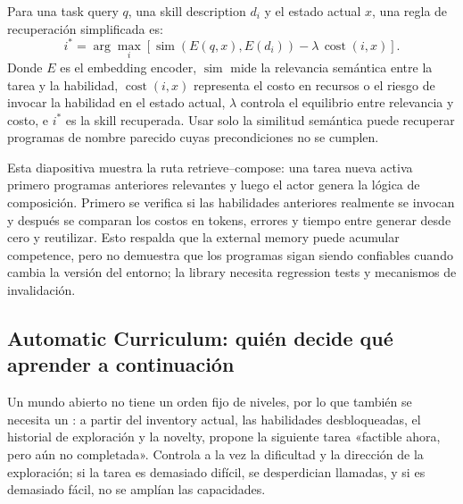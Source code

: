 Para una task query $q$, una skill description $d_i$ y el estado actual $x$, una regla de recuperación simplificada es:
\[
i^*=\arg\max_i\left[\operatorname{sim}(E(q,x),E(d_i))
-\lambda\,\operatorname{cost}(i,x)\right].
\]
Donde $E$ es el embedding encoder, $\operatorname{sim}$ mide la relevancia semántica entre la tarea y la habilidad, $\operatorname{cost}(i,x)$ representa el costo en recursos o el riesgo de invocar la habilidad en el estado actual, $\lambda$ controla el equilibrio entre relevancia y costo, e $i^*$ es la skill recuperada. Usar solo la similitud semántica puede recuperar programas de nombre parecido cuyas precondiciones no se cumplen.


Esta diapositiva muestra la ruta retrieve--compose: una tarea nueva activa primero programas anteriores relevantes y luego el actor genera la lógica de composición. Primero se verifica si las habilidades anteriores realmente se invocan y después se comparan los costos en tokens, errores y tiempo entre generar desde cero y reutilizar. Esto respalda que la external memory puede acumular competence, pero no demuestra que los programas sigan siendo confiables cuando cambia la versión del entorno; la library necesita regression tests y mecanismos de invalidación.


\subsection{Automatic Curriculum: quién decide qué aprender a continuación}

Un mundo abierto no tiene un orden fijo de niveles, por lo que también se necesita un : a partir del inventory actual, las habilidades desbloqueadas, el historial de exploración y la novelty, propone la siguiente tarea «factible ahora, pero aún no completada». Controla a la vez la dificultad y la dirección de la exploración; si la tarea es demasiado difícil, se desperdician llamadas, y si es demasiado fácil, no se amplían las capacidades.

